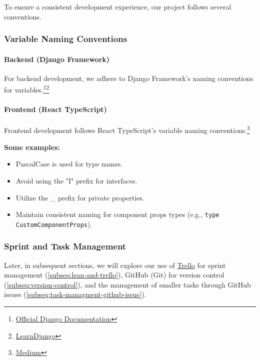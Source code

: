 \documentclass[12pt,a4paper]{article}
\begin{document}
\begin{spacing}{1.5}
    To ensure a consistent development experience, our project follows several
    conventions.

    \subsubsection{Variable Naming Conventions}

    \paragraph{Backend (Django Framework)}
    For backend development, we adhere to Django Framework's naming conventions for
    variables.\footnote{
        \href{https://docs.djangoproject.com/en/dev/internals/contributing/writing-code/coding-style/}{Official
            Django Documentation}}\footnote{
        \href{https://learndjango.com/tutorials/django-best-practices-projects-vs-apps}{LearnDjango}
    }
    \paragraph{Frontend (React TypeScript)} Frontend development follows React
    TypeScript's variable naming conventions.\footnote{
        \href{https://levelup.gitconnected.com/managing-types-in-react-typescript-the-right-way-fa1ecc50a2bf}{Medium}
    }

    \textbf{Some examples:}
    \begin{itemize}
        \item PascalCase is used for type names.
        \item Avoid using the "I" prefix for interfaces.
        \item Utilize the \_ prefix for private properties.
        \item Maintain consistent naming for component props types (e.g., \texttt{type
                  CustomComponentProps}).
    \end{itemize}

    \subsubsection{Sprint and Task Management}\label{subseq:conventions-sprint-and-task-managment}

    Later, in subsequent sections, we will explore our use of
    \href{https://trello.com/}{Trello} for sprint management
    (\autoref{subseq:lean-and-trello}), GitHub (Git) for version control
    (\autoref{subseq:version-control}), and the management of smaller tasks through
    GitHub issues (\autoref{subseq:task-managment-github-issue}).


\end{spacing}
\end{document}
